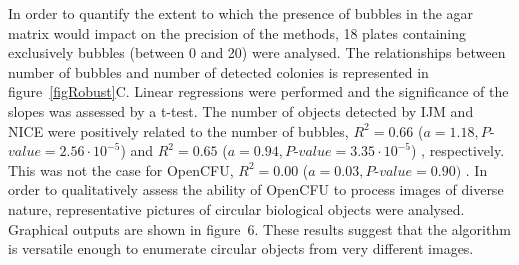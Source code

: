 \documentclass[10pt]{article}
\newcommand{\IJM}{IJM}
\newcommand{\BubbleNoiseOCFU}{$R^2 = 0.00$ ($a=0.03, P$-$value=0.90)$ }
\newcommand{\BubbleNoiseNICE}{$R^2 = 0.65$ ($a=0.94, P$-$value=3.35\cdot 10^{-5}$) }
\newcommand{\BubbleNoiseIJM}{$R^2 = 0.66$ ($a=1.18, P$-$value=2.56\cdot 10^{-5}$) }
\begin{document}
In order to quantify the extent to which the presence of bubbles in the agar matrix would impact on
the precision of the methods, 18 plates containing exclusively bubbles (between
0 and 20) were analysed. The relationships between number of bubbles and number
of detected colonies is represented in figure~\ref{figRobust}C. Linear
regressions were performed and the significance of the slopes was assessed by a
t-test. The number of objects detected by \IJM{} and NICE were positively
related to the number of bubbles, \BubbleNoiseIJM and \BubbleNoiseNICE, respectively.
This was not the case for OpenCFU, \BubbleNoiseOCFU.
In order to qualitatively assess the ability of OpenCFU to process images of diverse nature,
representative pictures of circular biological objects were analysed. 
Graphical outputs are shown 
in figure~6.
These results suggest
that the algorithm is versatile enough to 
enumerate circular objects from very different images.
\end{document}
